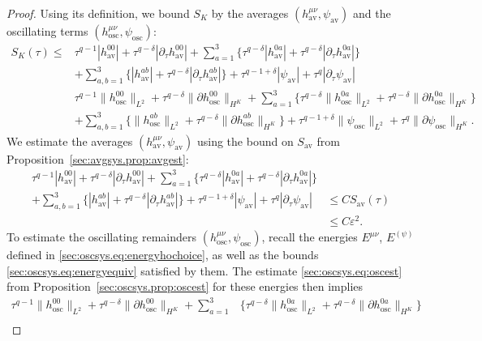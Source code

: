 \documentclass{article}
\newcommand{\osc}{\mathrm{osc}}
\newcommand{\av}{\mathrm{av}}
\newcommand{\ve}{\varepsilon}
\newcommand{\pa}{\partial}
\begin{document}
\begin{proof}
    Using its definition, we bound $S_K$ by the averages $(h_{\av}^{\mu\nu},\psi_{\av})$ and the oscillating terms $(h_{\osc}^{\mu\nu},\psi_{\osc})$:
    \begin{align}
        S_K(\tau) \leq & \tau^{q-1}|h_{\av}^{00}| + \tau^{q-\delta}|\pa_\tau h_{\av}^{00}| + \sum_{a=1}^3\Big\{\tau^{q-\delta}|h_{\av}^{0a}| + \tau^{q-\delta}|\pa_\tau h_{\av}^{0a}|\Big\}\nonumber\\
        &+ \sum_{a,b=1}^3\Big\{|h_{\av}^{ab}| + \tau^{q-\delta}|\pa_\tau h_{\av}^{ab}|\Big\} + \tau^{q-1+\delta}|\psi_{\av}| + \tau^q|\pa_\tau \psi_{\av}|\nonumber\\
        &\tau^{q-1}\|h_{\osc}^{00}\|_{L^2} + \tau^{q-\delta}\|\pa h_{\osc}^{00}\|_{H^K} + \sum_{a=1}^3\Big\{\tau^{q-\delta}\|h_{\osc}^{0a}\|_{L^2} + \tau^{q-\delta}\|\pa h_{\osc}^{0a}\|_{H^K}\Big\}\nonumber\\
        &+ \sum_{a,b=1}^3\Big\{\|h_{\osc}^{ab}\|_{L^2} + \tau^{q-\delta}\|\pa h_{\osc}^{ab}\|_{H^K}\Big\} + \tau^{q-1+\delta}\|\psi_{\osc}\|_{L^2} + \tau^q\|\pa \psi_{\osc}\|_{H^K}.\label{sec:completethm.eq:bootimpproof1}
    \end{align}
    We estimate the averages $(h_{\av}^{\mu\nu},\psi_{\av})$ using the bound on $S_{\av}$ from Proposition~\ref{sec:avgsys.prop:avgest}:
    \begin{align}
        \tau^{q-1}|h_{\av}^{00}| + \tau^{q-\delta}|\pa_\tau h_{\av}^{00}| + \sum_{a=1}^3\Big\{\tau^{q-\delta}|h_{\av}^{0a}| + \tau^{q-\delta}|\pa_\tau h_{\av}^{0a}|\Big\}&\nonumber\\
        +\sum_{a,b=1}^3\Big\{|h_{\av}^{ab}| + \tau^{q-\delta}|\pa_\tau h_{\av}^{ab}|\Big\} + \tau^{q-1+\delta}|\psi_{\av}| + \tau^q|\pa_\tau \psi_{\av}| &\leq CS_{\av}(\tau)\nonumber\\
        &\leq C\ve^2.\label{sec:completethm.eq:bootimpproof2}
    \end{align}
    To estimate the oscillating remainders $(h_{\osc}^{\mu\nu},\psi_{\osc})$, recall the energies $E^{\mu\nu}$, $E^{(\psi)}$ defined in \eqref{sec:oscsys.eq:energyhochoice}, as well as the bounds \eqref{sec:oscsys.eq:energyequiv} satisfied by them. The estimate \eqref{sec:oscsys.eq:oscest} from Proposition~\ref{sec:oscsys.prop:oscest} for these energies then implies
    \begin{align}
        \tau^{q-1}\|h_{\osc}^{00}\|_{L^2} + \tau^{q-\delta}\|\pa h_{\osc}^{00}\|_{H^K} + \sum_{a=1}^3&\Big\{\tau^{q-\delta}\|h_{\osc}^{0a}\|_{L^2} + \tau^{q-\delta}\|\pa h_{\osc}^{0a}\|_{H^K}\Big\}\nonumber\\

\end{align}
\end{proof}
\end{document}
